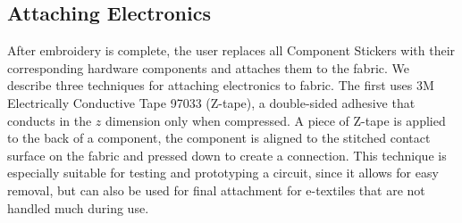 \documentclass[header.tex]{subfiles}
\begin{document}
\subsection{Attaching Electronics}



After embroidery is complete, the user replaces all Component Stickers with their corresponding hardware components and attaches them to the fabric.
We describe three techniques for attaching electronics to fabric. The first uses 3M Electrically Conductive Tape 97033 (Z-tape), a double-sided adhesive that conducts in the $z$ dimension only when compressed. A piece of Z-tape is applied to the back of a component, the component is aligned to the stitched contact surface on the fabric and pressed down to create a connection. This technique is especially suitable for testing and prototyping a circuit, since it allows for easy removal, but can also be used for final attachment for e-textiles that are not handled much during use.

\end{document}
